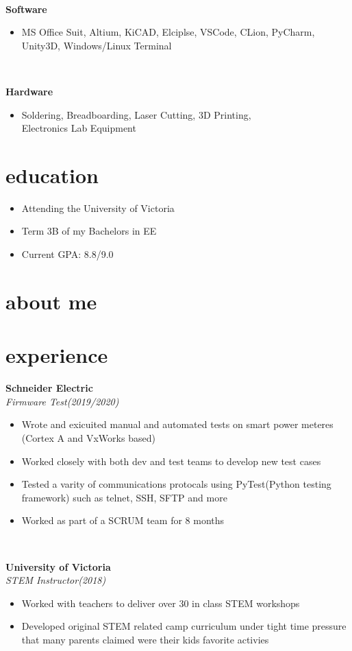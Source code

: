 \documentclass{article}
\newcommand{\grayhline}{
  \noindent\makebox[\linewidth]{\textcolor{gray}{\rule{0.95\textwidth}{1pt}}}\\
}
\newcommand{\minicolumns}[2]{
  \begin{minipage}[t]{0.25\textwidth}
    \begin{flushright}
      #1
    \end{flushright}
  \end{minipage}
  \hfill
  \begin{minipage}[t]{0.7\textwidth}
    #2
  \end{minipage}
}
\newcommand{\resumeSection}[3]{
  \minicolumns{
      \textbf{#1}\\
      \textit{#2}
    }
    {
      \begin{itemize}[leftmargin=*]
          \justifying
          \setlength\itemsep{-0.1em}
          #3
      \end{itemize}
  }
  \vspace{0.5\baselineskip}
}
\begin{document}
\begin{minipage}[t]{0.65\textwidth}
  \grayhline
  \resumeSection{Software}{}{
    \item MS Office Suit, Altium, KiCAD, Elciplse, VSCode, CLion, PyCharm, Unity3D, Windows/Linux Terminal
  }

  \grayhline
  \resumeSection{Hardware}{}{
    \item Soldering, Breadboarding, Laser Cutting, 3D Printing,\\ Electronics Lab Equipment
  }

\end{minipage}
\begin{minipage}[t]{0.34\textwidth}
  \section{education}
  \begin{itemize}[leftmargin=*]
    \setlength\itemsep{-0.1em}
    \item Attending the University of Victoria
    \item Term 3B of my Bachelors in EE
    \item Current GPA: 8.8/9.0
  \end{itemize}

  \section{about me}
  \paragraph{}

\end{minipage}

\section{experience}
\resumeSection{Schneider Electric}{Firmware Test(2019/2020)}{
  \item Wrote and exicuited manual and automated tests on smart power meteres (Cortex A and VxWorks based)
  \item Worked closely with both dev and test teams to develop new test cases
  \item Tested a varity of communications protocals using PyTest(Python testing framework) such as telnet, SSH, SFTP and more
  \item Worked as part of a SCRUM team for 8 months
}

\grayhline
\vspace{0.5\baselineskip}
\resumeSection{University of Victoria}{STEM Instructor(2018)}{
  \item Worked with teachers to deliver over 30 in class STEM workshops
  \item Developed original STEM related camp curriculum under tight time pressure
  that many parents claimed were their kids favorite activies
}
\end{document}
